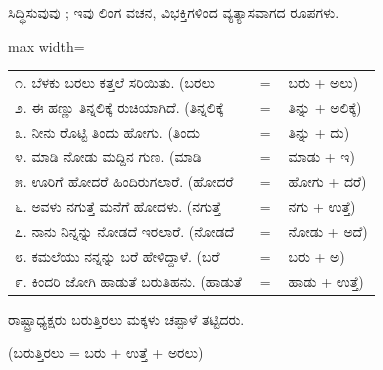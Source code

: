 \indent ಸಿದ್ಧಿಸುವುವು ; ಇವು ಲಿಂಗ ವಚನ, ವಿಭಕ್ತಿಗಳಿಂದ ವ್ಯತ್ಯಾಸವಾಗದ ರೂಪಗಳು.\par

\vspace{3pt plus 2pt}\noindent\hspace*{1.2em}\par\vspace{1pt}

\begin{kbvderiv}
\vspace{4pt plus 3pt minus 1pt}
\begin{center}\begin{adjustbox}{max width=\textwidth}
{\renewcommand{\arraystretch}{1.22}\setlength{\tabcolsep}{4pt}
\begin{tabular}{l c l}
೧. ಬೆಳಕು ಬರಲು ಕತ್ತಲೆ ಸರಿಯಿತು. (ಬರಲು & {\color{kbvgrey}$=$} & ಬರು + ಅಲು) \\
೨. ಈ ಹಣ್ಣು ತಿನ್ನಲಿಕ್ಕೆ ರುಚಿಯಾಗಿದೆ. (ತಿನ್ನಲಿಕ್ಕೆ & {\color{kbvgrey}$=$} & ತಿನ್ನು + ಅಲಿಕ್ಕೆ) \\
೩. ನೀನು ರೊಟ್ಟಿ ತಿಂದು ಹೋಗು. (ತಿಂದು & {\color{kbvgrey}$=$} & ತಿನ್ನು + ದು) \\
೪. ಮಾಡಿ ನೋಡು ಮದ್ದಿನ ಗುಣ. (ಮಾಡಿ & {\color{kbvgrey}$=$} & ಮಾಡು + ಇ) \\
೫. ಊರಿಗೆ ಹೋದರೆ ಹಿಂದಿರುಗಲಾರೆ. (ಹೋದರೆ & {\color{kbvgrey}$=$} & ಹೋಗು + ದರೆ) \\
೬. ಅವಳು ನಗುತ್ತೆ ಮನೆಗೆ ಹೋದಳು. (ನಗುತ್ತೆ & {\color{kbvgrey}$=$} & ನಗು + ಉತ್ತೆ) \\
೭. ನಾನು ನಿನ್ನನ್ನು ನೋಡದೆ ಇರಲಾರೆ. (ನೋಡದೆ & {\color{kbvgrey}$=$} & ನೋಡು + ಅದೆ) \\
೮. ಕಮಲೆಯು ನನ್ನನ್ನು ಬರೆ ಹೇಳಿದ್ದಾಳೆ. (ಬರೆ & {\color{kbvgrey}$=$} & ಬರು + ಅ) \\
೯. ಕಿಂದರಿ ಜೋಗಿ ಹಾಡುತೆ ಬರುತಿಹನು. (ಹಾಡುತೆ & {\color{kbvgrey}$=$} & ಹಾಡು + ಉತ್ತೆ) \\
\end{tabular}}
\end{adjustbox}\end{center}
\vspace{4pt plus 3pt minus 1pt}
\end{kbvderiv}

\vspace{2.5pt plus 3pt minus 0.5pt}\noindent\hspace*{1.2em}\hspace{0.55em}ರಾಷ್ಟ್ರಾಧ್ಯಕ್ಷರು ಬರುತ್ತಿರಲು ಮಕ್ಕಳು ಚಪ್ಪಾಳೆ ತಟ್ಟಿದರು.\par

\indent (ಬರುತ್ತಿರಲು = ಬರು + ಉತ್ತೆ + ಅರಲು)\par

